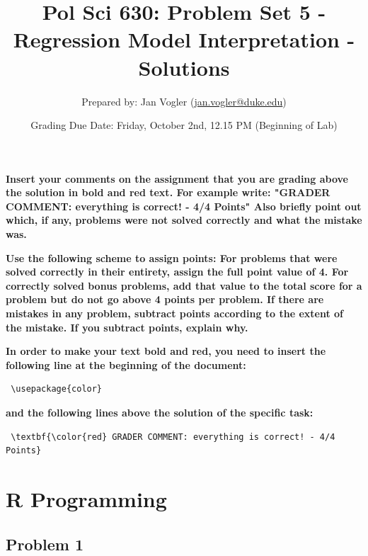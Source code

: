 \documentclass[12pt]{article}\usepackage[]{graphicx}\usepackage[]{color}
\begin{document}
\title{Pol Sci 630: Problem Set 5 - Regression Model Interpretation - Solutions}

\author{Prepared by: Jan Vogler (\href{mailto:jan.vogler@duke.edu}{jan.vogler@duke.edu})}

\date{Grading Due Date: Friday, October 2nd, 12.15 PM (Beginning of Lab)}
 
\maketitle



\textbf{\color{red} Insert your comments on the assignment that you are grading above the solution in bold and red text. For example write: "GRADER COMMENT: everything is correct! - 4/4 Points" Also briefly point out which, if any, problems were not solved correctly and what the mistake was.}

\bigskip

\textbf{Use the following scheme to assign points: For problems that were solved correctly in their entirety, assign the full point value of 4. For correctly solved bonus problems, add that value to the total score for a problem but do not go above 4 points per problem. If there are mistakes in any problem, subtract points according to the extent of the mistake. If you subtract points, explain why.}

\bigskip

\textbf{In order to make your text bold and red, you need to insert the following line at the beginning of the document:}

\begin{verbatim} \usepackage{color} \end{verbatim}

\textbf{and the following lines above the solution of the specific task:}

\begin{verbatim} \textbf{\color{red} GRADER COMMENT: everything is correct! - 4/4 Points} \end{verbatim}



\pagebreak

\section*{R Programming}

\subsection*{Problem 1}
\end{document}
